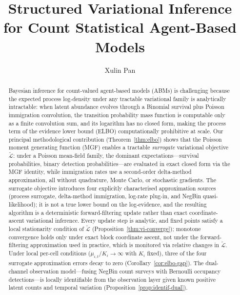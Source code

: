 \documentclass[review,12pt]{elsarticle}
\theoremstyle{definition}
\begin{document}
\begin{frontmatter}

\title{Structured Variational Inference for Count Statistical Agent-Based Models}

\author{Xulin Pan}
\address{Pennsylvania State University,
         University Park, PA 16802, USA}

\begin{abstract}
Bayesian inference for count-valued agent-based models (ABMs) is challenging
because the expected process log-density under any tractable variational
family is analytically intractable: when latent abundance evolves through a
Binomial survival plus Poisson immigration convolution, the transition
probability mass function is computable only as a finite convolution sum, and
its logarithm has no closed form, making the process term of the evidence
lower bound (ELBO) computationally prohibitive at scale.
Our principal methodological contribution (Theorem~\ref{thm:elbo}) shows that
the Poisson moment generating function (MGF) enables a tractable
\emph{surrogate} variational objective $\tilde{\mathcal{L}}$: under a
Poisson mean-field family, the dominant expectations---survival probabilities,
binary detection probabilities---are evaluated in exact closed form via the
MGF identity, while immigration rates use a second-order delta-method
approximation, all without quadrature, Monte Carlo, or stochastic gradients.
The surrogate objective introduces four explicitly characterised approximation
sources (process surrogate, delta-method immigration, log-rate plug-in, and
NegBin quasi-likelihood); it is not a true lower bound on the log-evidence,
and the resulting algorithm is a deterministic forward-filtering update rather
than exact coordinate-ascent variational inference.
Every update step is analytic, and fixed points satisfy a local stationarity
condition of $\tilde{\mathcal{L}}$ (Proposition~\ref{thm:vi-converge});
monotone convergence holds only under exact block coordinate ascent, not
under the forward-filtering approximation used in practice, which is monitored
via relative changes in $\tilde{\mathcal{L}}$.
Under local per-cell conditions ($\mu_{i,t}/K_i\to\infty$ with $K_i$ fixed),
three of the four surrogate approximation errors decay to zero
(Corollary~\ref{cor:elbo-gap}).  The dual-channel observation
model---fusing NegBin count surveys with Bernoulli occupancy detections---is
locally identifiable from the observation layer given known positive latent
counts and temporal variation (Proposition~\ref{prop:identif-dual}).

\end{abstract}
\end{frontmatter}
\end{document}
